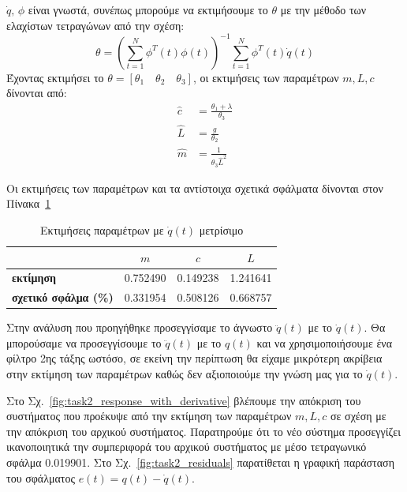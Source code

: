 \documentclass[a4paper,12pt]{article}
\begin{document}
$\dot{q}, \, \phi$ είναι γνωστά, συνέπως μπορούμε να εκτιμήσουμε το $\theta$ με την μέθοδο των ελαχίστων
τετραγώνων από την σχέση:
\begin{equation}
    \theta = \left(\sum_{t=1}^N\phi^T(t)\phi(t)\right)^{-1}\sum_{t=1}^N\phi^T(t)\dot{q}(t)
\end{equation}
Έχοντας εκτιμήσει το $\theta = [\theta_1 \quad \theta_2 \quad \theta_3]$, οι εκτιμήσεις των παραμέτρων $m, L, c$
δίνονται από:
\begin{equation}
    \begin{aligned}
        \hat{c} &= \frac{\theta_1 + \lambda}{\theta_3} \\
        \hat{L} &= \frac{g}{\theta_2} \\
        \hat{m} &= \frac{1}{\theta_3 \hat{L}^2}
    \end{aligned}
\end{equation}

Οι εκτιμήσεις των παραμέτρων και τα αντίστοιχα σχετικά σφάλματα δίνονται στον 
Πίνακα~\ref{tab:task2_estimations_with_derivative}

\begin{table}[h!]
\centering
\begin{tabular}{|l|c|c|c|}
\hline
\multicolumn{1}{|c|}{} & \multicolumn{1}{c|}{$m$} & \multicolumn{1}{c|}{$c$} & \multicolumn{1}{c|}{$L$} \\
\hline
\textbf{εκτίμηση} & 0.752490 & 0.149238 & 1.241641 \\
\textbf{σχετικό σφάλμα (\%)} & 0.331954 & 0.508126 & 0.668757 \\
\hline
\end{tabular}
\caption{Εκτιμήσεις παραμέτρων με $\dot{q}(t)$ μετρίσιμο}
\label{tab:task2_estimations_with_derivative}
\end{table}


Στην ανάλυση που προηγήθηκε προσεγγίσαμε το άγνωστο $\ddot{q}(t)$ με το $\dot{q}(t)$. Θα μπορούσαμε
να προσεγγίσουμε το $\ddot{q}(t)$ με το $q(t)$ και να χρησιμοποιήσουμε ένα φίλτρο 2ης τάξης ωστόσο,
σε εκείνη την περίπτωση θα είχαμε μικρότερη ακρίβεια στην εκτίμηση των παραμέτρων καθώς δεν αξιοποιούμε την γνώση
μας για το $\dot{q}(t)$.

Στο Σχ.~\ref{fig:task2_response_with_derivative} βλέπουμε την απόκριση του συστήματος που προέκυψε από την
εκτίμηση των παραμέτρων $m, L, c$ σε σχέση με την απόκριση του αρχικού συστήματος. Παρατηρούμε ότι το νέο σύστημα
προσεγγίζει ικανοποιητικά την συμπεριφορά του αρχικού συστήματος με μέσο τετραγωνικό σφάλμα 0.019901. Στο 
Σχ.~\ref{fig:task2_residuals} παρατίθεται
η γραφική παράσταση του σφάλματος $e(t) = q(t) - \dot{q}(t)$.
\end{document}
